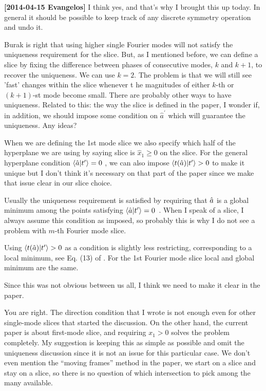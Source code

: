 \begin{description}
{\bf[2014-04-15 Evangelos]} I think yes, and that's why I brought this
up today. In general it should be possible to keep track of any discrete
symmetry operation and undo it.

\item[2014-04-30 Ruslan] Burak is right that using higher single Fourier modes
will not satisfy the uniqueness requirement for the slice.  But, as I mentioned before,
we can define a slice by fixing the difference between phases of consecutive modes,
$k$ and $k+1$, to recover the uniqueness.  We can use $k=2$.
The problem is that we will still see 'fast' changes within the slice whenever t
he magnitudes of either $k$-th or $(k+1)$-st mode become small.
There are probably other ways to have uniqueness.
Related to this: the way the slice is defined in the paper, I wonder if, in addition,
we should impose some condition on $\hat{a}^\prime$ which will guarantee the uniqueness.
Any ideas?

\item[2014-04-30 Burak] When we are defining the 1st mode slice we also
specify which half of the hyperplane we are using by saying slice is $\hat{x}_1 \geq 0$
on the slice. For the general hyperplane condition $\braket{\sspRed}{\sliceTan{}} = 0$
, we can also impose $\braket{\groupTan{(\sspRed})}{\sliceTan{}}>0$ to make
it unique but I don't think it's necessary on that part of the paper since
we make that issue clear in our slice choice.

\item[2014-04-30 Evangelos] Usually the uniqueness requirement is satisfied by requiring
that $\hat{a}$ is a global minimum among the points
satisfying $\braket{\sspRed}{\sliceTan{}} = 0$~\cite{SiCvi10,FrCv11,atlas12}.
When I speak of a slice, I always assume this condition as imposed, so probably this is why
I do not see a problem with $m$-th Fourier mode slice.

Using $\braket{\groupTan{(\sspRed})}{\sliceTan{}}>0$ as a condition is slightly less restricting,
corresponding to a local minimum, see Eq. (13) of . For the 1st Fourier mode
slice local and global minimum are the same.

Since this was not obvious between us all, I think we need to make it clear in the paper.

\item[2014-04-30 Burak] You are right. The direction condition that I wrote
is not enough even for other single-mode slices that started the discussion.
On the other hand, the current paper is about first-mode slice, and requiring
$x_1 > 0$ solves the problem completely. My suggestion is keeping this as
simple as possible and omit the uniqueness discussion since it is not an
issue for this particular case. We don't even mention the ``moving frames''
method in the paper, we start on a slice and stay on a slice, so there is
no question of which intersection to pick among the many available.


\end{description}
